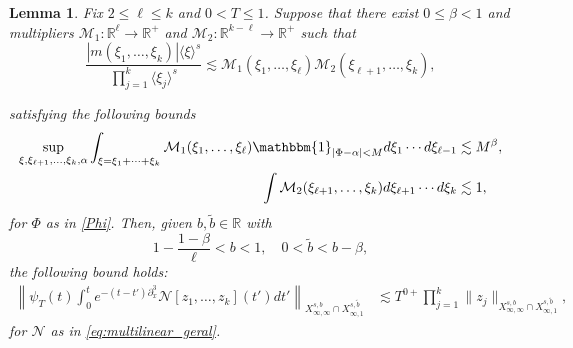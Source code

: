 \documentclass[a4paper,
11pt,  reqno]{amsart}
\newcommand{\jap}[1]{\langle #1 \rangle}
\newcommand{\5}{\textup{V}}
\newcommand{\noi}{\noindent}
\newcommand{\les}{\lesssim}
\newcommand{\wt}{\widetilde}
\newtheorem{lemma}[theorem]{Lemma}
\theoremstyle{remark}
\newcommand{\R}{\mathbb{R}}
\renewcommand{\l}{\ell}
\numberwithin{equation}{section}
\numberwithin{theorem}{section}
\newcommand{\Ncal}{\mathcal{N}}
\begin{document}
		\begin{lemma}\label{lem:reduction_fre_kge3}
			Fix $2\le \ell\le k$ and $0<T \le 1$. Suppose that there exist $0\le \beta<1$ and multipliers $\mathcal{M}_1:\R^\l \to \R^+$ and $\mathcal{M}_2:\R^{k-\ell}\to \R^+$ such that
			\begin{equation}
				\frac{|m(\xi_1, \ldots, \xi_k)|\jap{\xi}^s}{\prod_{j=1}^k\jap{\xi_j}^s} \lesssim \mathcal{M}_1(\xi_1,\dots, \xi_{\l})\mathcal{M}_2(\xi_{\ell+1},\dots, \xi_{{k}}),
			\end{equation}


            \noi
            satisfying the following bounds
            \begin{align}
                \sup_{\xi, \xi_{\ell+1},\dots , \xi_{k},\alpha} \int_{\xi=\xi_1 + \cdots + \xi_k} \mathcal{M}_1(\xi_1,\dots,\xi_\l) \mathbbm{1}_{|\Phi-\alpha|<M} d\xi_1\cdots d\xi_{\ell-1} &
                \lesssim
                M^\beta
                 \label{fre_kge3},
                 \\
                 \int \mathcal{M}_2(\xi_{\ell+1},\ldots, \xi_{{k}}) d\xi_{\ell+1}\cdots d\xi_k
                &
                \les 1,
                \label{fre_kge32}
            \end{align}
            for $\Phi$ as in \eqref{Phi}.
            Then, given $b,\wt b\in \R$ with
            $$
            1-\frac{1-\beta}{\ell}<b<1,\quad 0<\wt{b}<b-\beta,
            $$
            the following  bound holds:
			\begin{align}\label{frek}
				\left\|\psi_T (t)\int_0^te^{-(t-t')\partial_x^3}\Ncal[z_1,\dots, z_k](t')dt' \right\|_{X^{s,b}_{\infty, \infty}\cap X^{s,\wt{b}}_{\infty, 1}} & \les T^{0+}\prod_{j=1}^k\|z_j\|_{X^{s,b}_{\infty, \infty} \cap X^{s,\wt{b}}_{\infty,1}}
                ,
			\end{align}
			for $\Ncal$ as in \eqref{eq:multilinear_geral}.
		\end{lemma}
\end{document}

